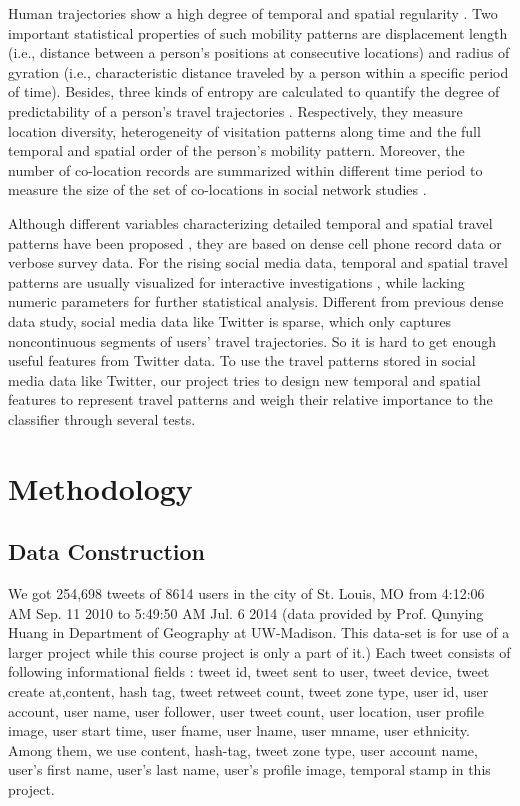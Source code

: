 \documentclass{article}
\begin{document}
Human trajectories show a high degree of temporal and spatial regularity \cite{gonzalez2008understanding}. Two important statistical properties of such mobility patterns are displacement length (i.e., distance between a person's positions at consecutive locations) and radius of gyration (i.e., characteristic distance traveled by a person within a specific period of time)\cite{gonzalez2008understanding}. Besides, three kinds of entropy are  calculated to quantify the degree of predictability of a person's travel trajectories \cite{song2010limits}. Respectively, they measure location diversity, heterogeneity of visitation patterns along time and the full  temporal and spatial order of the person's mobility pattern. Moreover, the number of co-location records  are summarized within different time period to measure the size of the set of co-locations in social network studies \cite{cranshaw2010bridging}. 

Although different variables characterizing detailed temporal and spatial travel patterns have been proposed , they are based on dense cell phone record data or verbose survey data. For the rising social media data,  temporal and spatial  travel patterns are usually visualized for interactive investigations \cite{yin2016exploring}, while lacking numeric parameters for further statistical analysis. Different from previous dense data study, social media data like Twitter is sparse, which only captures noncontinuous segments of users' travel trajectories. So it  is hard to get enough useful features from Twitter data. To use the travel patterns stored in social media data like Twitter, our project tries to design new temporal and spatial features to represent travel patterns and weigh their relative importance to the classifier through several tests.

\section{Methodology}
\subsection{Data Construction}

We got 254,698 tweets of 8614 users in the city of St. Louis, MO from 4:12:06 AM Sep. 11 2010 to 5:49:50 AM Jul. 6 2014 (data provided by Prof. Qunying Huang in Department of Geography at UW-Madison. This data-set is for use of a larger project while this course project is only a part of it.) Each tweet consists of following informational fields :  tweet id, tweet sent to user,	tweet device, tweet create at,content, hash tag, tweet retweet count,	tweet zone type,	user id,	user account,	user name,	user follower,	user tweet count,	user location,	user profile image,	user start time,	user fname,	user lname,	user mname,	user ethnicity. Among them, we use content, hash-tag, tweet zone type, user account name, user's first name, user's last name, user's profile image, temporal stamp in this project. 
\end{document}
